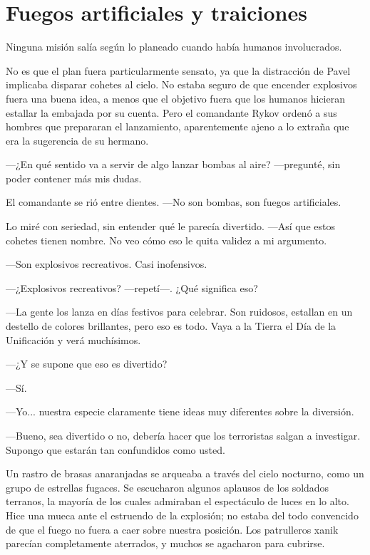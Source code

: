 \chapter{Fuegos artificiales y traiciones}\label{sec:fuegos-artificiales-y-traiciones}

Ninguna misión salía según lo planeado cuando había humanos involucrados.

No es que el plan fuera particularmente sensato, ya que la distracción de Pavel implicaba disparar cohetes al cielo. No estaba seguro de que encender explosivos fuera una buena idea, a menos que el objetivo fuera que los humanos hicieran estallar la embajada por su cuenta. Pero el comandante Rykov ordenó a sus hombres que prepararan el lanzamiento, aparentemente ajeno a lo extraña que era la sugerencia de su hermano.

 —¿En qué sentido va a servir de algo lanzar bombas al aire? —pregunté, sin poder contener más mis dudas.

El comandante se rió entre dientes. —No son bombas, son fuegos artificiales.

Lo miré con seriedad, sin entender qué le parecía divertido. —Así que estos cohetes tienen nombre. No veo cómo eso le quita validez a mi argumento.

—Son explosivos recreativos. Casi inofensivos.

 —¿Explosivos recreativos? —repetí—. ¿Qué significa eso?

—La gente los lanza en días festivos para celebrar. Son ruidosos, estallan en un destello de colores brillantes, pero eso es todo. Vaya a la Tierra el Día de la Unificación y verá muchísimos.

 —¿Y se supone que eso es divertido?

—Sí.

—Yo... nuestra especie claramente tiene ideas muy diferentes sobre la diversión.

—Bueno, sea divertido o no, debería hacer que los terroristas salgan a investigar. Supongo que estarán tan confundidos como usted.

Un rastro de brasas anaranjadas se arqueaba a través del cielo nocturno, como un grupo de estrellas fugaces. Se escucharon algunos aplausos de los soldados terranos, la mayoría de los cuales admiraban el espectáculo de luces en lo alto. Hice una mueca ante el estruendo de la explosión; no estaba del todo convencido de que el fuego no fuera a caer sobre nuestra posición. Los patrulleros xanik parecían completamente aterrados, y muchos se agacharon para cubrirse.

